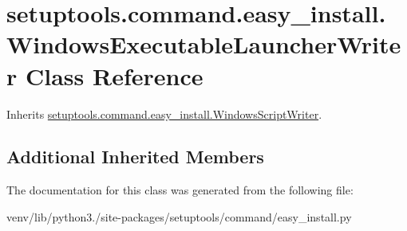 \hypertarget{classsetuptools_1_1command_1_1easy__install_1_1_windows_executable_launcher_writer}{}\section{setuptools.\+command.\+easy\+\_\+install.\+Windows\+Executable\+Launcher\+Writer Class Reference}
\label{classsetuptools_1_1command_1_1easy__install_1_1_windows_executable_launcher_writer}


Inherits \hyperlink{classsetuptools_1_1command_1_1easy__install_1_1_windows_script_writer}{setuptools.\+command.\+easy\+\_\+install.\+Windows\+Script\+Writer}.

\subsection*{Additional Inherited Members}


The documentation for this class was generated from the following file\+:\begin{DoxyCompactItemize}
\item 
venv/lib/python3./site-\/packages/setuptools/command/easy\+\_\+install.\+py\end{DoxyCompactItemize}
